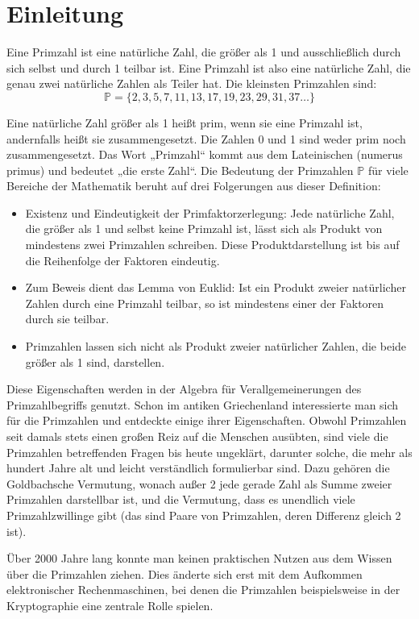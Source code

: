 
\chapter{Einleitung}

Eine Primzahl ist eine natürliche Zahl, die größer als 1 und ausschließlich durch sich selbst und durch 1 teilbar ist. 
Eine Primzahl ist also eine natürliche Zahl, die genau zwei natürliche Zahlen als Teiler hat.
Die kleinsten Primzahlen sind:
\begin{equation*}
      \mathbb{P} = \{2,3,5,7,11,13,17,19,23,29,31,37\dots\}
\end{equation*}

Eine natürliche Zahl größer als 1 heißt prim, wenn sie eine Primzahl ist, andernfalls heißt sie zusammengesetzt.
Die Zahlen 0 und 1 sind weder prim noch zusammengesetzt.
Das Wort „Primzahl“ kommt aus dem Lateinischen (numerus primus) und bedeutet „die erste Zahl“.
Die Bedeutung der Primzahlen $\mathbb{P}$ für viele Bereiche der Mathematik beruht auf drei Folgerungen aus dieser Definition:

\begin{itemize}
    \item Existenz und Eindeutigkeit der Primfaktorzerlegung: Jede natürliche Zahl, die größer als 1 und selbst keine Primzahl ist, lässt sich als Produkt von mindestens zwei Primzahlen schreiben.
        Diese Produktdarstellung ist bis auf die Reihenfolge der Faktoren eindeutig. 
    
    \item Zum Beweis dient das Lemma von Euklid: Ist ein Produkt zweier natürlicher Zahlen durch eine Primzahl teilbar, so ist mindestens einer der Faktoren durch sie teilbar.

    \item Primzahlen lassen sich nicht als Produkt zweier natürlicher Zahlen, die beide größer als 1 sind, darstellen.
\end{itemize}
    
Diese Eigenschaften werden in der Algebra für Verallgemeinerungen des Primzahlbegriffs genutzt.
Schon im antiken Griechenland interessierte man sich für die Primzahlen und entdeckte einige ihrer Eigenschaften. 
Obwohl Primzahlen seit damals stets einen großen Reiz auf die Menschen ausübten, sind viele die Primzahlen betreffenden Fragen bis heute ungeklärt, darunter solche, die mehr als hundert Jahre alt und leicht verständlich formulierbar sind.
Dazu gehören die Goldbachsche Vermutung, wonach außer 2 jede gerade Zahl als Summe zweier Primzahlen darstellbar ist, und die Vermutung, dass es unendlich viele Primzahlzwillinge gibt (das sind Paare von Primzahlen, deren Differenz gleich 2 ist).

Über 2000 Jahre lang konnte man keinen praktischen Nutzen aus dem Wissen über die Primzahlen ziehen. 
Dies änderte sich erst mit dem Aufkommen elektronischer Rechenmaschinen, bei denen die Primzahlen beispielsweise in der Kryptographie eine zentrale Rolle spielen.
